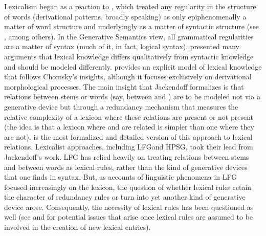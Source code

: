 \documentclass[output=paper,biblatex,babelshorthands,newtxmath,draftmode,colorlinks,citecolor=brown]{langscibook}
\begin{document}
Lexicalism began as a reaction to , which treated any regularity in the
structure of words (derivational patterns, broadly speaking) as only epiphenomenally a matter of
word structure and underlyingly as a matter of syntactic structure (see \citealt{Lakoff1970}, among
others). In the Generative Semantics view, all grammatical regularities are a matter of syntax (much
of it, in fact, logical syntax). \citet{Chomsky1970} presented many arguments that lexical knowledge
differs qualitatively from syntactic knowledge and should be modeled
differently. \citet{Jackendoff1975} provides an explicit model of lexical knowledge that follows Chomsky's
insights, although it focuses exclusively on derivational morphological processes. The main insight
that Jackendoff formalizes is that relations between stems  or words (say, between
 and ) are to be modeled not via a generative device but through a
redundancy mechanism that measures the relative complexity of a lexicon where these relations are
present or not present (the idea is that a lexicon where  and 
are related is simpler than one where they are not). \citet{Bochner1993} is the most formalized and
detailed version of this approach to lexical relations. Lexicalist approaches, including
LFG\indexlfg and HPSG, took their lead from Jackendoff's work.  LFG
has relied heavily on treating relations between stems and between words as lexical rules, rather
than the kind of generative devices that one finds in syntax. But, as accounts of linguistic
phenomena in LFG focused increasingly on the lexicon, the question of whether lexical rules retain
the character of redundancy rules or turn into yet another kind of generative device arose.
Consequently, the necessity of lexical rules has been questioned as well (see
\citealt{KoenigandJurafsky1994} and \citealt[29--49]{Koenig1999c} for potential issues that arise
once lexical rules are assumed to be involved in the creation of new lexical entries).
\end{document}
